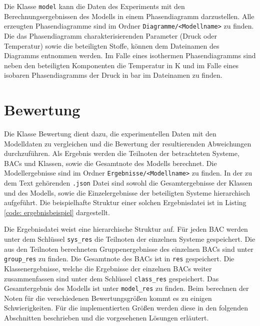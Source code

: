 \documentclass[../thesis.tex]{subfiles}
\begin{document}
Die Klasse \texttt{model} kann die Daten des Experiments mit den Berechnungsergebnissen des Modells in einem Phasendiagramm darzustellen. Alle erzeugten Phasendiagramme sind im Ordner \texttt{Diagramme/<Modellname>} zu finden. Die das Phasendiagramm charakterisierenden Parameter (Druck oder Temperatur) sowie die beteiligten Stoffe, können dem Dateinamen des Diagramms entnommen werden. Im Falle eines isothermen Phasendiagramms sind neben den beteiligten Komponenten die Temperatur in K und im Falle eines isobaren Phasendiagramms der Druck in bar im Dateinamen zu finden.

\section{Bewertung}

Die Klasse Bewertung dient dazu, die experimentellen Daten mit den Modelldaten zu vergleichen und die Bewertung der resultierenden Abweichungen durchzuführen. Als Ergebnis werden die Teilnoten der betrachteten Systeme, BACs und Klassen, sowie die Gesamtnote des Modells berechnet. Die Modellergebnisse sind im Ordner \texttt{Ergebnisse/<Modellname>} zu finden. In der zu dem Text gehörenden \texttt{.json} Datei sind sowohl die Gesamtergebnisse der Klassen und des Modells, sowie die Einzelergebnisse der beteiligten Systeme hierarchisch aufgeführt. Die beispielhafte Struktur einer solchen Ergebnisdatei ist in Listing \autoref{code: ergebnisbeispiel} dargestellt.


\label{code: ergebnisbeispiel}

Die Ergebnisdatei weist eine hierarchische Struktur auf. Für jeden BAC werden unter dem Schlüssel \texttt{sys\_res} die Teilnoten der einzelnen Systeme gespeichert. Die aus den Teilnoten berechneten Gruppenergebnisse des einzelnen BACs sind unter \texttt{group\_res} zu finden. Die Gesamtnote des BACs ist in \texttt{res} gespeichert. Die Klassenergebnisse, welche die Ergebnisse der einzelnen BACs weiter zusammenfassen sind unter dem Schlüssel \texttt{class\_res} gespeichert. Das Gesamtergebnis des Modells ist unter \texttt{model\_res} zu finden. Beim berechnen der Noten für die verschiedenen Bewertungsgrößen kommt es zu einigen Schwierigkeiten. Für die implementierten Größen werden diese in den folgenden Abschnitten beschrieben und die vorgesehenen Lösungen erläutert.
\end{document}
